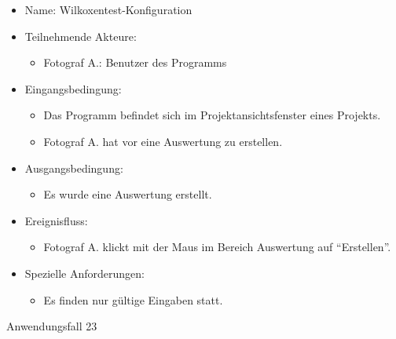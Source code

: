 	\begin{itemize}
		\item Name: Wilkoxentest-Konfiguration
		\item Teilnehmende Akteure:
		\begin{itemize}
			\item	Fotograf A.: Benutzer des Programms		
		\end{itemize}
		\item Eingangsbedingung:
		\begin{itemize}
			\item	Das Programm befindet sich im Projektansichtsfenster eines Projekts.
			\item Fotograf A. hat vor eine Auswertung zu erstellen.
		\end{itemize}
		\item Ausgangsbedingung:
		\begin{itemize}
			\item	Es wurde eine Auswertung erstellt.	
		\end{itemize}
		\item Ereignisfluss:
		\begin{itemize}
			\item Fotograf A. klickt mit der Maus im Bereich Auswertung auf "`Erstellen"'.
		\end{itemize}
		\item Spezielle Anforderungen:
		\begin{itemize}
			\item	Es finden nur gültige Eingaben statt.
		\end{itemize}			
	\end{itemize}
	
	\begin{description}
		\item[Anwendungsfall 23]
	\end{description}
	
